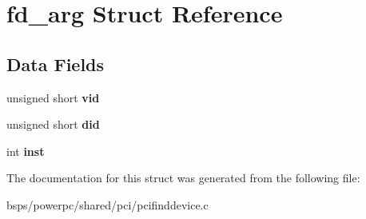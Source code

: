 \hypertarget{structfd__arg}{}\section{fd\+\_\+arg Struct Reference}
\label{structfd__arg}
\subsection*{Data Fields}
\begin{DoxyCompactItemize}
\item 
\mbox{\label{structfd__arg_a95e4a5c7012ffe900d207d05f2c1783c}} 
unsigned short {\bfseries vid}
\item 
\mbox{\label{structfd__arg_a34f23a293cbe02c9e0c88e83eb2e002c}} 
unsigned short {\bfseries did}
\item 
\mbox{\label{structfd__arg_a8676acec17b5f3bb68784473e948d0f4}} 
int {\bfseries inst}
\end{DoxyCompactItemize}


The documentation for this struct was generated from the following file\+:\begin{DoxyCompactItemize}
\item 
bsps/powerpc/shared/pci/pcifinddevice.\+c\end{DoxyCompactItemize}
